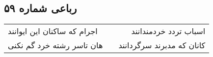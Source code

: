 \begin{center}
\section*{رباعی شماره ۵۹}
\label{sec:sh059}
\begin{longtable}{l p{0.5cm} r}
اجرام که ساکنان این ایوانند
&&
اسباب تردد خردمندانند
\\
هان تاسر رشته خرد گم نکنی
&&
کانان که مدبرند سرگردانند
\\
\end{longtable}
\end{center}
